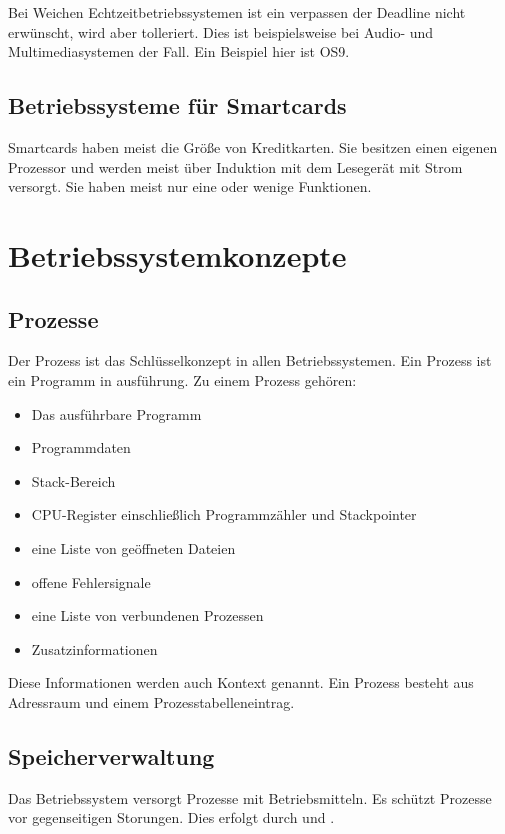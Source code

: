 Bei Weichen Echtzeitbetriebssystemen ist ein verpassen der Deadline nicht erwünscht, wird aber tolleriert. Dies ist beispielsweise bei Audio- und Multimediasystemen der Fall. Ein Beispiel hier ist OS9.

\subsection{Betriebssysteme für Smartcards}

Smartcards haben meist die Größe von Kreditkarten. Sie besitzen einen eigenen Prozessor und werden meist über Induktion mit dem Lesegerät mit Strom versorgt. Sie haben meist nur eine oder wenige Funktionen.

\section{Betriebssystemkonzepte}

\subsection{Prozesse}

Der Prozess ist das Schlüsselkonzept in allen Betriebssystemen. Ein Prozess ist ein Programm in ausführung. Zu einem Prozess gehören:

\begin{itemize}
    \item Das ausführbare Programm
    \item Programmdaten
    \item Stack-Bereich
    \item CPU-Register einschließlich Programmzähler und Stackpointer
    \item eine Liste von geöffneten Dateien
    \item offene Fehlersignale
    \item eine Liste von verbundenen Prozessen
    \item Zusatzinformationen
\end{itemize}

Diese Informationen werden auch Kontext genannt. Ein Prozess besteht aus Adressraum und einem Prozesstabelleneintrag.

\subsection{Speicherverwaltung}

Das Betriebssystem versorgt Prozesse mit Betriebsmitteln. Es schützt Prozesse vor gegenseitigen Storungen. Dies erfolgt durch  und .


